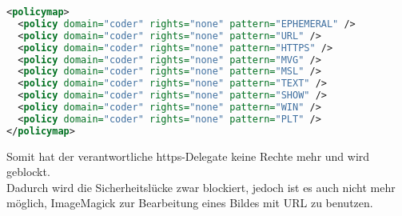 \begin{lstlisting}[language=XML, caption=config/Policy.xml Inhalt,label={lst:lstlisting}]
<policymap>
  <policy domain="coder" rights="none" pattern="EPHEMERAL" />
  <policy domain="coder" rights="none" pattern="URL" />
  <policy domain="coder" rights="none" pattern="HTTPS" />
  <policy domain="coder" rights="none" pattern="MVG" />
  <policy domain="coder" rights="none" pattern="MSL" />
  <policy domain="coder" rights="none" pattern="TEXT" />
  <policy domain="coder" rights="none" pattern="SHOW" />
  <policy domain="coder" rights="none" pattern="WIN" />
  <policy domain="coder" rights="none" pattern="PLT" />
</policymap>
\end{lstlisting}
\vspace{5mm}

Somit hat der verantwortliche https-Delegate keine Rechte mehr und wird geblockt.\\
Dadurch wird die Sicherheitslücke zwar blockiert, jedoch ist es auch nicht mehr möglich, ImageMagick zur Bearbeitung eines Bildes mit URL zu benutzen.\\